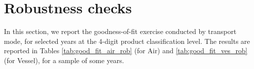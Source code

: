 \documentclass[a4paper,11pt]{article}
\begin{document}
\section{Robustness checks \label{app:robust_4d}}

In this section, we report the goodness-of-fit exercise conducted by transport mode, for selected years at the 4-digit product classification level. The results are reported in Tables \ref{tab:good_fit_air_rob} (for Air) and \ref{tab:good_fit_ves_rob} (for Vessel), for a sample of some years.
\begin{table}[htbp]
  \centering
  \caption{Air: Measures of Goodness-of-fit, 4-digits}
\begin{center}
\label{tab:good_fit_air_rob}%
\end{center}
\end{table}
\end{document}
